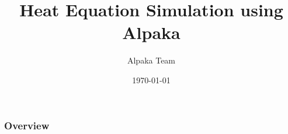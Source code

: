 \documentclass[9pt]{beamer}
\title[2D Heat Equation Simulation]{Heat Equation Simulation using Alpaka} %
\author{Alpaka Team} %
\institute[HZDR] %
{
HZDR \\ %
\medskip
\textit{} %
}
\date{\today} %
\begin{document}
\begin{frame}
\titlepage %
\end{frame}

\begin{frame}
\frametitle{Overview} %
\tableofcontents %
\end{frame}


\end{document}
